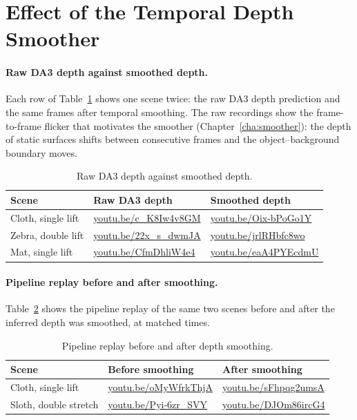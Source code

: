 \section{Effect of the Temporal Depth Smoother}
\label{sec:app-vid-smoother}

\paragraph{Raw DA3 depth against smoothed depth.}
\label{sec:app-vid-raw}

Each row of Table~\ref{tab:app-vid-raw} shows one scene twice: the raw DA3 depth prediction and the
same frames after temporal smoothing. The raw recordings show the frame-to-frame flicker that
motivates the smoother (Chapter~\ref{cha:smoother}): the depth of static surfaces shifts between
consecutive frames and the object--background boundary moves.

\begin{table}[H]
    \caption{Raw DA3 depth against smoothed depth.}
    \label{tab:app-vid-raw}
    \begin{center}
        \small
        \begin{tabular}{@{}p{3.4cm}ll@{}} \toprule
            Scene & Raw DA3 depth & Smoothed depth \\ \midrule
            Cloth, single lift & \url{youtu.be/c_K8Iw4v8GM} & \url{youtu.be/Oix-bPoGo1Y} \\
            Zebra, double lift & \url{youtu.be/22x_s_dwmJA} & \url{youtu.be/jrlRHbfc8wo} \\
            Mat, single lift   & \url{youtu.be/CfmDhliW4e4} & \url{youtu.be/eaA4PYEcdmU} \\ \bottomrule
        \end{tabular}
    \end{center}
\end{table}

\paragraph{Pipeline replay before and after smoothing.}
\label{sec:app-vid-smooth}

Table~\ref{tab:app-vid-smooth} shows the pipeline replay of the same two scenes before and after
the inferred depth was smoothed, at matched times.

\begin{table}[H]
    \caption{Pipeline replay before and after depth smoothing.}
    \label{tab:app-vid-smooth}
    \begin{center}
        \small
        \begin{tabular}{@{}p{3.4cm}ll@{}} \toprule
            Scene & Before smoothing & After smoothing \\ \midrule
            Cloth, single lift  & \url{youtu.be/oMyWfrkThjA} & \url{youtu.be/sFhpqg2umsA} \\
            Sloth, double stretch & \url{youtu.be/Pyi-6zr_SVY} & \url{youtu.be/DJOm86ircG4} \\ \bottomrule
        \end{tabular}
    \end{center}
\end{table}

